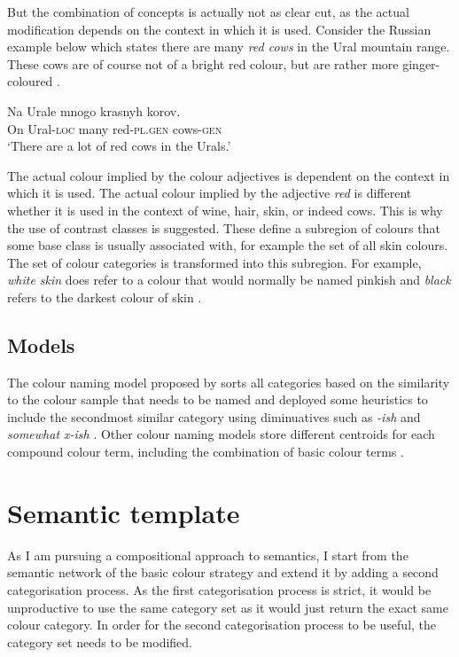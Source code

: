 But the combination of concepts is actually not as clear cut, as the
actual modification depends on the context in which it is
used. Consider the Russian example below which states there are many
\textit{red cows} in the Ural mountain range. These cows are of course not
of a bright red colour, but are rather more ginger-coloured
\citep{tribushinina08cognitive}.

\ea
\gll Na Urale mnogo krasnyh korov.\\
On Ural-\textsc{loc} many red-\textsc{pl.gen} cows-\textsc{gen}\\
\glt `There are a lot of red cows in the Urals.'\\
\z


The actual colour implied by the colour adjectives is dependent on
the context in which it is used. The actual colour implied by the
adjective \textit{red} is different whether it is used in the context of
wine, hair, skin, or indeed cows. This is why the use of contrast
classes is suggested. These define a subregion of colours that some
base class is usually associated with, for example the set of all skin
colours. The set of colour categories is transformed into this
subregion. For example, \textit{white skin} does refer to a colour that
would normally be named pinkish and \textit{black} refers to the darkest
colour of skin \citep{gardenfors04conceptual}.

\subsection{Models}

The colour naming model proposed by
\citeauthor{lammens94computational} sorts all categories based on the
similarity to the colour sample that needs to be named and deployed
some heuristics to include the secondmost similar category using
diminuatives such as \textit{-ish} and \textit{somewhat x-ish}
\citep{lammens94computational}. Other colour naming models store
different centroids for each compound colour term, including the
combination of basic colour terms \citep{mojsilovic05computational}.

\section{Semantic template}
\label{s:ccs-semantic-template}

As I am pursuing a compositional approach to semantics, I start from
the semantic network of the basic colour strategy and extend it by
adding a second categorisation process. As the first categorisation
process is strict, it would be unproductive to use the same category
set as it would just return the exact same colour category. In order
for the second categorisation process to be useful, the category set
needs to be modified.

